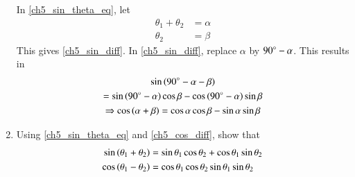 \begin{enumerate}[label=\arabic*.,ref=\thesubsection.\theenumi]
\solution In \eqref{ch5_sin_theta_eq}, let
%
\begin{equation}
\begin{split}
\theta_1 + \theta_2 &= \alpha \\
\theta_2 &=  \beta
\end{split}
\end{equation}
%
This gives \eqref{ch5_sin_diff}.  In \eqref{ch5_sin_diff}, replace $\alpha$ by 
%
$90{\degree} - \alpha$.  This results in
%
\begin{multline}
\sin\left(90{\degree} - \alpha - \beta\right)
\\
=
\sin \left(90{\degree} -\alpha\right) \cos \beta - \cos \left(90{\degree} -\alpha\right) \sin \beta \\
\Rightarrow \cos\left(\alpha + \beta\right) = \cos \alpha \cos \beta - \sin \alpha \sin \beta
\end{multline}
% 
\item
	Using \eqref{ch5_sin_theta_eq} and \eqref{ch5_cos_diff}, show that
\begin{align}
\label{ch5_sin_sum}
\sin\left(\theta_1 + \theta_2\right) &= \sin\theta_1  \cos\theta_2 + \cos\theta_1\sin\theta_2
\\
\cos\left(\theta_1 - \theta_2\right) &= \cos\theta_1  \cos\theta_2  \sin\theta_1\sin\theta_2
\label{ch5_cos_sum}
\end{align}


\end{enumerate}
